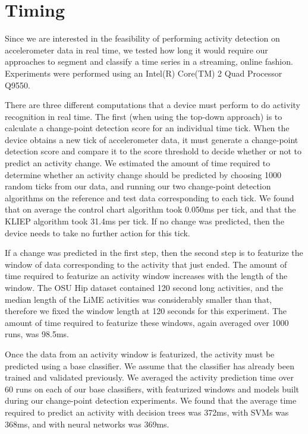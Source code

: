 \section{Timing}

Since we are interested in the feasibility of performing activity detection on
accelerometer data in real time, we tested how long it would require our
approaches to segment and classify a time series in a streaming, online fashion.
Experiments were performed using an Intel(R) Core(TM) 2 Quad Processor Q9550.

There are three different computations that a device must perform to do
activity recognition in real time. The first (when using the top-down approach)
is to calculate a change-point
detection score for an individual time tick. When the device obtains a new tick of
accelerometer data, it must generate a change-point detection score and compare
it to the score threshold to decide whether or not to predict an activity
change. We estimated the amount of time required to determine whether an
activity change should be predicted by choosing 1000 random ticks from our data,
and running our two change-point detection algorithms on the reference and test
data corresponding to each tick. We found that on average the control chart algorithm
took 0.050ms per tick, and that the KLIEP algorithm took 31.4ms per tick. If no change
was predicted, then the device needs to take no further action for this tick.

If a change was predicted in the first step, then the second step is to
featurize the window of data corresponding to the activity that just ended.
The amount of time required to featurize an activity window increases with the
length of the window. The OSU Hip dataset contained 120 second long activities,
and the median length of the LiME activities was considerably smaller than that,
therefore we fixed the window length at 120 seconds for this experiment. The
amount of time required to featurize these windows, again averaged over 1000 runs,
was 98.5ms.

Once the data from an activity window is featurized, the activity must be
predicted using a base classifier. We assume that the classifier has already
been trained and validated previously. We averaged the activity prediction time
over 60 runs on each of our base classifiers, with featurized windows and models
built during our change-point detection experiments. We found that the average
time required to predict an activity with decision trees was 372ms, with
SVMs was 368ms, and with neural networks was 369ms.

